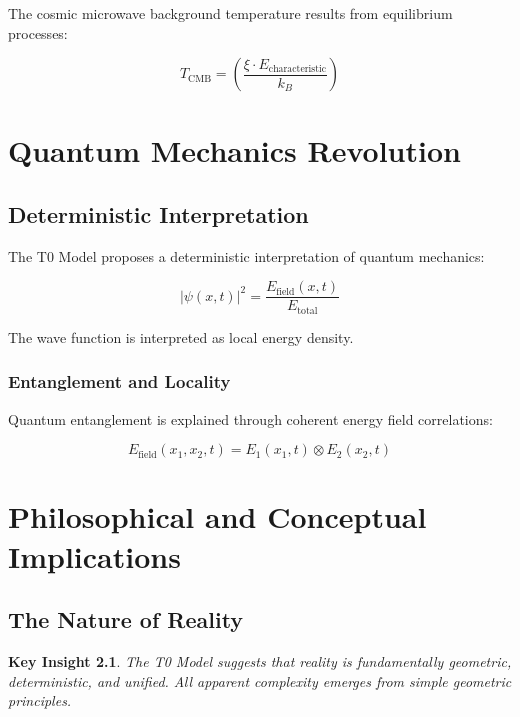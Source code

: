 \documentclass[12pt,a4paper]{report}
\newtheorem{insight}{Key Insight}[chapter]
\begin{document}
	The cosmic microwave background temperature results from equilibrium processes:
	
	\begin{equation}
		T_{\text{CMB}} = \left(\frac{\xi \cdot E_{\text{characteristic}}}{k_B}\right)
	\end{equation}
	
	\chapter{Quantum Mechanics Revolution}
	
	\section{Deterministic Interpretation}
	
	The T0 Model proposes a deterministic interpretation of quantum mechanics:
	
	\begin{equation}
		|\psi(x,t)|^2 = \frac{E_{\text{field}}(x,t)}{E_{\text{total}}}
	\end{equation}
	
	The wave function is interpreted as local energy density.
	
	\subsection{Entanglement and Locality}
	
	Quantum entanglement is explained through coherent energy field correlations:
	
	\begin{equation}
		E_{\text{field}}(x_1, x_2, t) = E_1(x_1,t) \otimes E_2(x_2,t)
	\end{equation}
	
	\chapter{Philosophical and Conceptual Implications}
	
	\section{The Nature of Reality}
	
	\begin{insight}
		The T0 Model suggests that reality is fundamentally geometric, deterministic, and unified. All apparent complexity emerges from simple geometric principles.
	\end{insight}
	
\end{document}
